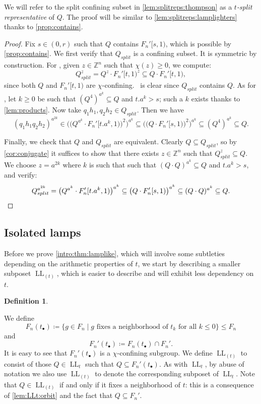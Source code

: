 \documentclass[reqno,12pt]{amsart}\setcounter{tocdepth}{1}
\theoremstyle{definition}
\newtheorem{definition}[theorem]{Definition}
\newcommand{\Z}{\mathbb{Z}}
\DeclareMathOperator{\LL}{LL}
\numberwithin{equation}{section}
\begin{document}
We will refer to the split confining subset in \cref{lem:splitreps:thompson} as a \emph{$t$-split representative} of $Q$. The proof will be similar to \cref{lem:splitreps:lamplighters} thanks to \cref{prop:contains}.

\begin{proof}
Fix $s \in (0, r)$ such that $Q$ contains $F_n'[s, 1)$, which is possible by \cref{prop:contains}.
We first verify that $Q_{split}$ is a confining subset. It is symmetric by construction. For \StayInConf, given $z \in \Z^n$ such that $\chi(z) \geq 0$, we compute:
\[Q_{split}^z = Q^z \cdot F_n'[t, 1)^z \subseteq Q \cdot F_n'[t, 1),\]
since both $Q$ and $F_n'[t, 1)$ are $\chi$-confining.
\GetInConf\ is clear since $Q_{split}$ contains $Q$.
As for \ProdConf, let $k \geq 0$ be such that $(Q^4)^{a^k} \subseteq Q$ and $t.a^k > s$; such a $k$ exists thanks to \cref{lem:products}.
Now take $q_1 h_1, q_2 h_2 \in Q_{split}$. Then we have
\[
(q_1 h_1 q_2 h_2)^{a^{2k}} \in \bigg(\big(Q^{a^k} \cdot F_n'[t.a^k, 1)\big)^2\bigg)^{a^k} \subseteq \bigg(\big(Q \cdot F_n'[s, 1)\big)^2\bigg)^{a^k} \subseteq (Q^4)^{a^k} \subseteq Q \text{.}
\]

Finally, we check that $Q$ and $Q_{split}$ are equivalent. Clearly $Q \subseteq Q_{split}$, so by \cref{cor:conjugate} it suffices to show that there exists $z \in \Z^n$ such that $Q_{split}^z \subseteq Q$. We choose $z = a^{2k}$ where $k$ is such that such that $(Q \cdot Q)^{a^k} \subseteq Q$ and $t.a^k > s$, and verify:
\[
Q_{split}^{a^{2k}} = \big(Q^{a^k} \cdot F_n'[t.a^k, 1)\big)^{a^k} \subseteq \big(Q \cdot F_n'[s, 1)\big)^{a^k} \subseteq (Q \cdot Q)^{a^k} \subseteq Q. \qedhere
\]
\end{proof}


\subsection{Isolated lamps}

Before we prove \cref{intro:thm:lamplike}, which will involve some subtleties depending on the arithmetic properties of $t$, we start by describing a smaller subposet $\LL_{(t)}$, which is easier to describe and will exhibit less dependency on $t$.

\begin{definition}
\label{def:Fnt:isolated}

We define
\[F_n(t_\bullet) \coloneqq \{ g \in F_n \mid g \text{ fixes a neighborhood of } t_k \text{ for all } k \leq 0 \} \leq F_n\]
and
\[
F_n'(t_\bullet) \coloneqq F_n(t_\bullet) \cap F_n'.
\]
It is easy to see that $F_n'(t_\bullet)$ is a $\chi$-confining subgroup. We define $\LL_{(t)}$ to consist of those $Q \in \LL_t$ such that $Q \subseteq F_n'(t_\bullet)$. As with $\LL_t$, by abuse of notation we also use $\LL_{(t)}$ to denote the corresponding subposet of $\LL_t$. Note that $Q \in \LL_{(t)}$ if and only if it fixes a neighborhood of $t$: this is a consequence of \cref{lem:LLt:orbit} and the fact that $Q \subseteq F_n'$.
\end{definition}
\end{document}
